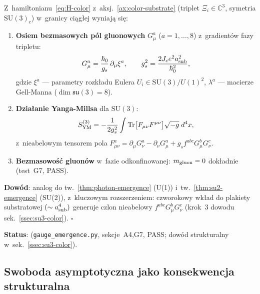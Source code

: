 \begin{theorem}%
\label{thm:V-gluon-emergence}
Z~hamiltonianu~\eqref{eq:H-color} z~aksj.~\ref{ax:color-substrate}
(triplet $\Xi_i \in \mathbb{C}^3$, symetria $\mathrm{SU}(3)_c$)
w~granicy ci\k{a}g\l{}ej wyniaj\k{a} si\k{e}:
\begin{enumerate}[nosep]
  \item \textbf{Osiem bezmasowych p\'ol gluonowych}
    $G_\mu^a$ ($a = 1,\ldots,8$)
    z~gradient\'ow fazy tripletu:
    \begin{equation}\label{eq:V-gluon-id}
      G_\mu^a = \frac{\hbar_0}{g_s}\,\partial_\mu\xi^a,
      \qquad
      g_s^2 = \frac{2J_c e^2 a_{\rm sub}^2}{\hbar_0^2},
    \end{equation}
    gdzie $\xi^a$ --- parametry rozkładu Eulera
    $U_i \in \mathrm{SU}(3)/U(1)^2$,
    $\lambda^a$ --- macierze Gell-Manna ($\dim\mathfrak{su}(3) = 8$).
  \item \textbf{Dzia\l{}anie Yanga-Millsa} dla $\mathrm{SU}(3)$:
    \begin{equation}\label{eq:V-YM}
      S_{\rm YM}^{(3)}
        = -\frac{1}{2g_s^2}
          \int \mathrm{Tr}\bigl[F_{\mu\nu}F^{\mu\nu}\bigr]
          \sqrt{-g}\;d^4x,
    \end{equation}
    z~nieabelowym tensorem pola
    $F_{\mu\nu}^a = \partial_\mu G_\nu^a - \partial_\nu G_\mu^a
      + g_s f^{abc} G_\mu^b G_\nu^c$.
  \item \textbf{Bezmasowo\'s\'c gluon\'ow} w~fazie odkonfinowanej:
    $m_{\rm gluon} = 0$ dok\l{}adnie (test~G7, PASS).
\end{enumerate}

\textbf{Dow\'od}: analog do tw.~\ref{thm:photon-emergence} (U(1))
i~tw.~\ref{thm:su2-emergence} (SU(2)),
z~kluczowym rozszerzeniem: czworokowy wk\l{}ad do plakiety substratowej
$(\sim a_{\rm sub}^4)$ generuje czlon nieabelowy
$f^{abc} G_\mu^b G_\nu^c$ (krok~3 dowodu sek.~\ref{ssec:su3-color}).
\hfill$\square$

\textbf{Status}: 
(\texttt{gauge\_emergence.py}, sekcje~A4,G7, PASS;
dow\'od strukturalny w~sek.~\ref{ssec:su3-color}).
\end{theorem}

\subsection{Swoboda asymptotyczna jako konsekwencja strukturalna}%
\label{app:V-AF}


